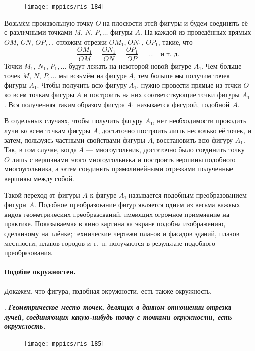 \documentclass[oneside]{book}
\begin{document}
\begin{figure}[h]
\centering
\texttt{[image: mppics/ris-184]}
\caption{}\label{1938/ris-184}
\end{figure}

Возьмём произвольную точку $O$ на плоскости этой фигуры и будем соединять её с различными точками $M$, $N$, $P,\dots$
фигуры $A$.
На каждой из проведённых прямых $OM$, $ON$, $OP,\dots$
отложим отрезки $OM_1$, $ON_1$, $OP_1$, такие, что 
\[\frac{OM_1}{OM}=\frac{ON_1}{ON}=\frac{OP_1}{OP}=\dots\quad\text{и т.~д.}\]
Точки $M_1$, $N_1$, $P_1,\dots$ будут лежать на некоторой новой фигуре $A_1$.
Чем больше точек $M$, $N$, $P,\dots$
мы возьмём на фигуре $A$, тем больше мы получим точек фигуры $A_1$.
Чтобы получить всю фигуру $A_1$, нужно провести прямые из точки $O$ ко всем точкам фигуры $A$ и построить на них соответствующие точки фигуры $A_1$.
Вся полученная таким образом фигура $A_1$ называется фигурой, подобной~$A$.

В отдельных случаях, чтобы получить фигуру $A_1$, нет необходимости проводить лучи ко всем точкам фигуры $A$, достаточно построить лишь несколько её точек, и затем, пользуясь частными свойствами фигуры $A$, восстановить всю фигуру $A_1$.
Так, в том случае, когда $A$ — многоугольник, достаточно было соединить точку $O$ лишь с вершинами этого многоугольника и построить вершины подобного многоугольника, а затем соединить прямолинейными отрезками полученные вершины между собой.

Такой переход от фигуры $A$ к фигуре $A_1$ называется подобным преобразованием фигуры $A$. %
Подобное преобразование фигур является одним из весьма важных видов геометрических преобразований, имеющих огромное применение на практике.
Показываемая в кино картина на экране подобна изображению, сделанному на плёнке;
технические чертежи планов и фасадов зданий, планов местности, планов городов и т.~п.
получаются в результате подобного преобразования.

\paragraph{Подобие окружностей.}\label{1938/178}
Докажем, что фигура, подобная окружности, есть также окружность.


.
\textbf{\emph{Геометрическое место точек, делящих в данном отношении отрезки лучей, соединяющих какую-нибудь точку с точками окружности, есть окружность.}}

\begin{figure}[h]
\centering
\texttt{[image: mppics/ris-185]}
\caption{}\label{1938/ris-185}
\end{figure}
\end{document}
